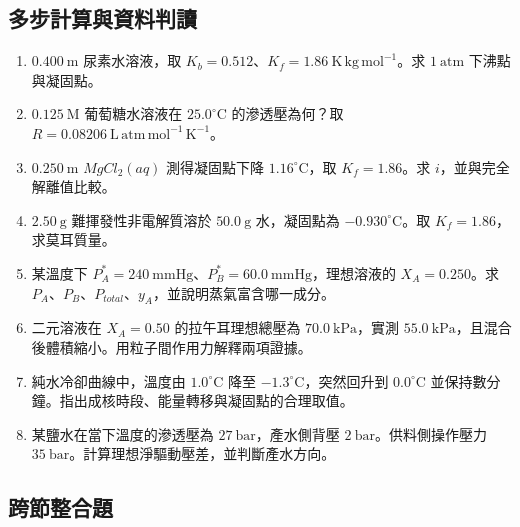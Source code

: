 \documentclass[11pt,a4paper]{article}
\providecommand{\tightlist}{%
  \setlength{\itemsep}{0pt}\setlength{\parskip}{0pt}}
\begin{document}
\subsection{多步計算與資料判讀}\label{ux591aux6b65ux8a08ux7b97ux8207ux8cc7ux6599ux5224ux8b80}

\begin{enumerate}
\def\labelenumi{\arabic{enumi}.}
\setcounter{enumi}{4}
\tightlist
\item
  \(0.400\ \mathrm m\) 尿素水溶液，取 \(K_b=0.512\)、\(K_f=1.86\ \mathrm{K\,kg\,mol^{-1}}\)。求 \(1\ \mathrm{atm}\) 下沸點與凝固點。
\item
  \(0.125\ \mathrm M\) 葡萄糖水溶液在 \(25.0^\circ\mathrm C\) 的滲透壓為何？取 \(R=0.08206\ \mathrm{L\,atm\,mol^{-1}\,K^{-1}}\)。
\item
  \(0.250\ \mathrm m\) \(MgCl_2(aq)\) 測得凝固點下降 \(1.16^\circ\mathrm C\)，取 \(K_f=1.86\)。求 \(i\)，並與完全解離值比較。
\item
  \(2.50\ \mathrm g\) 難揮發性非電解質溶於 \(50.0\ \mathrm g\) 水，凝固點為 \(-0.930^\circ\mathrm C\)。取 \(K_f=1.86\)，求莫耳質量。
\item
  某溫度下 \(P_A^*=240\ \mathrm{mmHg}\)、\(P_B^*=60.0\ \mathrm{mmHg}\)，理想溶液的 \(X_A=0.250\)。求 \(P_A\)、\(P_B\)、\(P_{total}\)、\(y_A\)，並說明蒸氣富含哪一成分。
\item
  二元溶液在 \(X_A=0.50\) 的拉午耳理想總壓為 \(70.0\ \mathrm{kPa}\)，實測 \(55.0\ \mathrm{kPa}\)，且混合後體積縮小。用粒子間作用力解釋兩項證據。
\item
  純水冷卻曲線中，溫度由 \(1.0^\circ\mathrm C\) 降至 \(-1.3^\circ\mathrm C\)，突然回升到 \(0.0^\circ\mathrm C\) 並保持數分鐘。指出成核時段、能量轉移與凝固點的合理取值。
\item
  某鹽水在當下溫度的滲透壓為 \(27\ \mathrm{bar}\)，產水側背壓 \(2\ \mathrm{bar}\)。供料側操作壓力 \(35\ \mathrm{bar}\)。計算理想淨驅動壓差，並判斷產水方向。
\end{enumerate}

\subsection{跨節整合題}\label{ux8de8ux7bc0ux6574ux5408ux984c}
\end{document}

